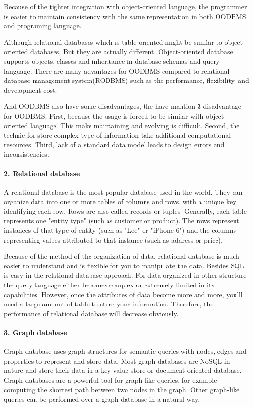 Because of the tighter integration with object-oriented language, the programmer is easier to maintain consistency with the same representation in both OODBMS and programing language.

Although relational databases which is table-oriented might be similar to object-oriented databases, But they are actually different. Object-oriented database supports objects, classes and inheritance in database schemas and query language.
There are many advantages for OODBMS compared to relational database management system(RODBMS) such as the performance, flexibility, and development cost.

And OODBMS also have some disadvantages, the \cite{Systems2010} have mantion 3 disadvantage for OODBMS. First, because the usage is forced to be similar with object-oriented language. This make maintaining and evolving is  difficult. Second, the technic for store complex type of information take additional computational resources. Third, lack of a standard data model leads to design errors and inconsistencies.


\paragraph{2. Relational database}
A relational database is the most popular database used in the world. They can organize data into one or more tables of columns and rows, with a unique key identifying each row. Rows are also called records or tuples. Generally, each table represents one "entity type" (such as customer or product). The rows represent instances of that type of entity (such as "Lee" or "iPhone 6") and the columns representing values attributed to that instance (such as address or price).

Because of the method of the organization of data, relational database is much easier to understand and is flexible for you to manipulate the data. Besides SQL is easy in the relational database approach. For data organized in other structure the query language either becomes complex or extremely limited in its capabilities. However, once the attributes of data become more and more, you'll need a large amount of table to store your information. Therefore, the performance of relational database will decrease obviously.


\paragraph{3. Graph database}
Graph database uses graph structures for semantic queries with nodes,  edges and properties to represent and store data. Most graph databases are NoSQL in nature and store their data in a key-value store or document-oriented database. Graph databases are a powerful tool for graph-like queries, for example computing the shortest path between two nodes in the graph. Other graph-like queries can be performed over a graph database in a natural way.

